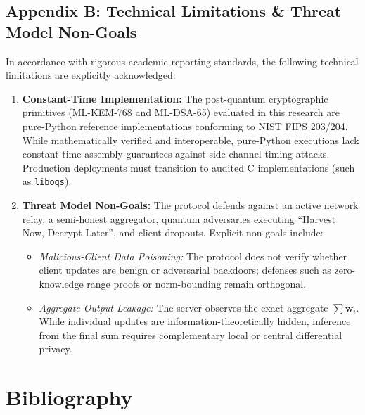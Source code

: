 \documentclass[11pt,a4paper]{report}
\begin{document}
\section*{Appendix B: Technical Limitations \& Threat Model Non-Goals}
In accordance with rigorous academic reporting standards, the following technical limitations are explicitly acknowledged:
\begin{enumerate}[itemsep=4pt]
  \item \textbf{Constant-Time Implementation:} The post-quantum cryptographic primitives (ML-KEM-768 and ML-DSA-65) evaluated in this research are pure-Python reference implementations conforming to NIST FIPS 203/204. While mathematically verified and interoperable, pure-Python executions lack constant-time assembly guarantees against side-channel timing attacks. Production deployments must transition to audited C implementations (such as \lstinline|liboqs|).
  \item \textbf{Threat Model Non-Goals:} The protocol defends against an active network relay, a semi-honest aggregator, quantum adversaries executing ``Harvest Now, Decrypt Later'', and client dropouts. Explicit non-goals include:
  \begin{itemize}[itemsep=2pt]
    \item \textit{Malicious-Client Data Poisoning:} The protocol does not verify whether client updates are benign or adversarial backdoors; defenses such as zero-knowledge range proofs or norm-bounding remain orthogonal.
    \item \textit{Aggregate Output Leakage:} The server observes the exact aggregate $\sum \mathbf{w}_i$. While individual updates are information-theoretically hidden, inference from the final sum requires complementary local or central differential privacy.
  \end{itemize}
\end{enumerate}

\chapter*{Bibliography}
\end{document}
